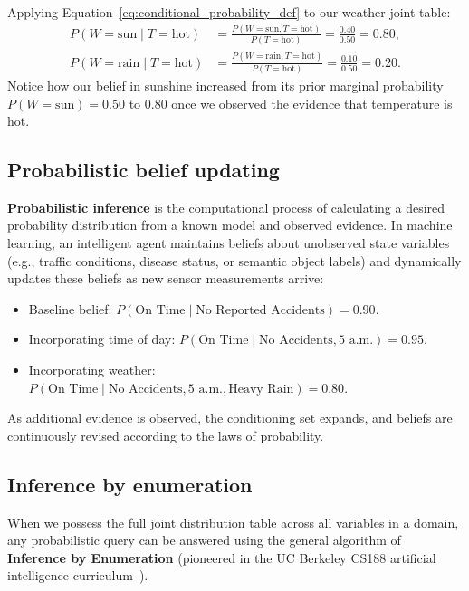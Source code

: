 Applying Equation~\eqref{eq:conditional_probability_def} to our weather joint table:
\begin{align}
P(W = \text{sun} \mid T = \text{hot}) &= \frac{P(W=\text{sun}, T=\text{hot})}{P(T=\text{hot})} = \frac{0.40}{0.50} = 0.80, \\
P(W = \text{rain} \mid T = \text{hot}) &= \frac{P(W=\text{rain}, T=\text{hot})}{P(T=\text{hot})} = \frac{0.10}{0.50} = 0.20.
\end{align}
Notice how our belief in sunshine increased from its prior marginal probability $P(W = \text{sun}) = 0.50$ to $0.80$ once we observed the evidence that temperature is hot.

\subsection{Probabilistic belief updating}
\label{sec:belief_updating}

\textbf{Probabilistic inference} is the computational process of calculating a desired probability distribution from a known model and observed evidence. In machine learning, an intelligent agent maintains beliefs about unobserved state variables (e.g., traffic conditions, disease status, or semantic object labels) and dynamically updates these beliefs as new sensor measurements arrive:
\begin{itemize}[noitemsep]
  \item Baseline belief: $P(\text{On Time} \mid \text{No Reported Accidents}) = 0.90$.
  \item Incorporating time of day: $P(\text{On Time} \mid \text{No Accidents}, 5\text{ a.m.}) = 0.95$.
  \item Incorporating weather: $P(\text{On Time} \mid \text{No Accidents}, 5\text{ a.m.}, \text{Heavy Rain}) = 0.80$.
\end{itemize}
As additional evidence is observed, the conditioning set expands, and beliefs are continuously revised according to the laws of probability.

\subsection{Inference by enumeration}
\label{sec:inference_by_enumeration}

When we possess the full joint distribution table across all variables in a domain, any probabilistic query can be answered using the general algorithm of \textbf{Inference by Enumeration} (pioneered in the UC Berkeley CS188 artificial intelligence curriculum~\cite{russell2020artificial}).

